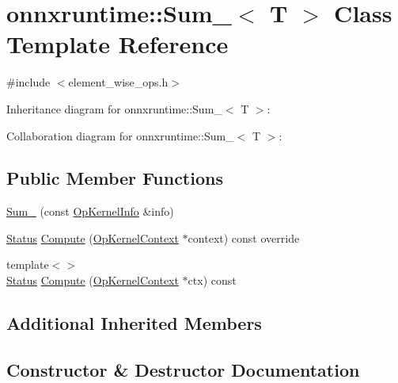 \hypertarget{classonnxruntime_1_1Sum__6}{}\section{onnxruntime\+:\+:Sum\+\_$<$ T $>$ Class Template Reference}
\label{classonnxruntime_1_1Sum__6}


{\ttfamily \#include $<$element\+\_\+wise\+\_\+ops.\+h$>$}



Inheritance diagram for onnxruntime\+:\+:Sum\+\_$<$ T $>$\+:


Collaboration diagram for onnxruntime\+:\+:Sum\+\_$<$ T $>$\+:
\subsection*{Public Member Functions}
\begin{DoxyCompactItemize}
\item 
\mbox{\hyperlink{classonnxruntime_1_1Sum__6_ad08458840d42ff76f4c7616db3a91712}{Sum\+\_}} (const \mbox{\hyperlink{classonnxruntime_1_1OpKernelInfo}{Op\+Kernel\+Info}} \&info)
\item 
\mbox{\hyperlink{classonnxruntime_1_1common_1_1Status}{Status}} \mbox{\hyperlink{classonnxruntime_1_1Sum__6_aaa5c575ed8920c1b030d4d08fe311f2c}{Compute}} (\mbox{\hyperlink{classonnxruntime_1_1OpKernelContext}{Op\+Kernel\+Context}} $\ast$context) const override
\item 
{\footnotesize template$<$$>$ }\\\mbox{\hyperlink{classonnxruntime_1_1common_1_1Status}{Status}} \mbox{\hyperlink{classonnxruntime_1_1Sum__6_a6f6600ed769bc41914f255ff24beb22f}{Compute}} (\mbox{\hyperlink{classonnxruntime_1_1OpKernelContext}{Op\+Kernel\+Context}} $\ast$ctx) const
\end{DoxyCompactItemize}
\subsection*{Additional Inherited Members}


\subsection{Constructor \& Destructor Documentation}
\mbox{\label{classonnxruntime_1_1Sum__6_ad08458840d42ff76f4c7616db3a91712}} 

